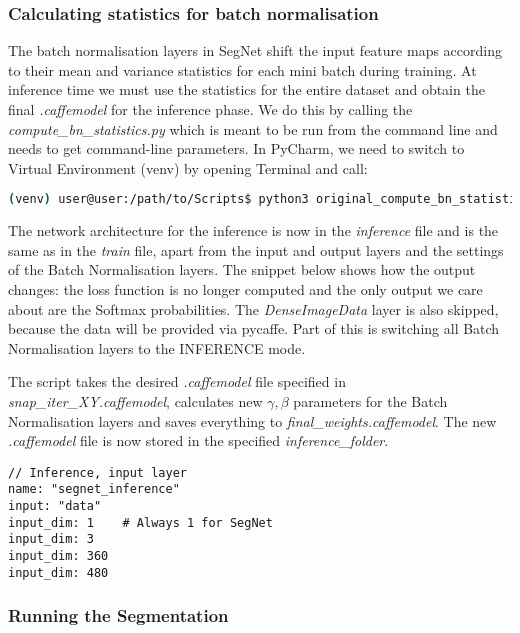 \subsubsection{Calculating statistics for batch normalisation}
The batch normalisation layers in SegNet shift the input feature maps according to their mean and variance statistics for each mini batch during training. At inference time we must use the statistics for the entire dataset and obtain the final \textit{.caffemodel} for the inference phase. \cite{segnet_get_started} We do this by calling the \textit{compute\_bn\_statistics.py} which is meant to be run from the command line and needs to get command-line parameters. In PyCharm, we need to switch to Virtual Environment (venv) by opening Terminal and call:

\begin{lstlisting}[language=bash]
(venv) user@user:/path/to/Scripts$ python3 original_compute_bn_statistics.py /path/to/train.prototxt /path/to/snap_iter_XY.caffemodel /path/to/inference_folder
\end{lstlisting}

The network architecture for the inference is now in the \textit{inference} file and is the same as in the \textit{train} file, apart from the input and output layers and the settings of the Batch Normalisation layers. The snippet below shows how the output changes: the loss function is no longer computed and the only output we care about are the Softmax probabilities. The \textit{DenseImageData} layer is also skipped, because the data will be provided via pycaffe. Part of this is switching all Batch Normalisation layers to the INFERENCE mode.

The script takes the desired \textit{.caffemodel} file specified in \textit{snap\_iter\_XY.caffemodel}, calculates new $ \gamma, \beta $ parameters for the Batch Normalisation layers and saves everything to \textit{final\_weights.caffemodel}. The new \textit{.caffemodel} file is now stored in the specified \textit{inference\_folder}.

\begin{lstlisting}[caption={Replacing input layer type in \textit{inference.prototxt}},captionpos=b]
// Inference, input layer
name: "segnet_inference"
input: "data"
input_dim: 1	# Always 1 for SegNet
input_dim: 3
input_dim: 360
input_dim: 480
\end{lstlisting}

\subsubsection{Running the Segmentation}

